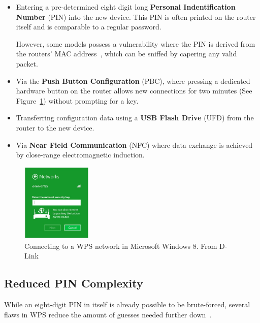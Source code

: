 \begin{itemize}

\item{Entering a pre-determined eight digit long \textbf{Personal Indentification Number} (PIN) into the new device. This PIN is often printed on the router itself and is comparable to a regular password. 

However, some models possess a vulnerability where the PIN is derived from the routers' MAC address~\cite{Craig14}, which can be sniffed by capering any valid packet.}

\item{Via the \textbf{Push Button Configuration} (PBC), where pressing a dedicated hardware button on the router allows new connections for two minutes (See Figure~\ref{fig:wpsbutton}) without prompting for a key. }

\item{Transferring configuration data using a \textbf{USB Flash Drive} (UFD) from the router to the new device.}

\item{Via \textbf{Near Field Communication} (NFC) where data exchange is achieved by close-range electromagnetic induction.}

\end{itemize}

\begin{figure} %
\includegraphics[width=0.3\textwidth]{src/img/DIR-890L-WPS-Button-windows-8c.jpg}
\caption{Connecting to a WPS network in Microsoft Windows 8. From D-Link~\cite{DLink14}}\label{fig:wpsbutton}
\end{figure}

\subsection{Reduced PIN Complexity}\label{sec:wpsredpin}

While an eight-digit PIN in itself is already possible to be brute-forced, several flaws in WPS reduce the amount of guesses needed further down~\cite{Ducklin15}. 

